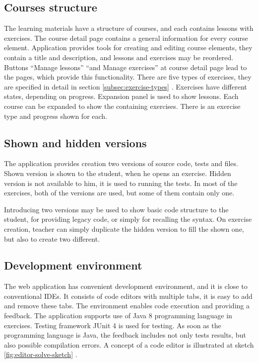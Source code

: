         \subsection{Courses structure}
        The learning materials have a structure of courses, and each contains lessons with exercises. The course detail page contains a general information for every course element. Application provides tools for creating and editing course elements, they contain a title and description, and lessons and exercises may be reordered. Buttons ``Manage lessons'' ``and Manage exercises'' at course detail page lead to the pages, which provide this functionality. There are five types of exercises, they are specified in detail in section \ref{subsec:exercise-types} . Exercises have different states, depending on progress. Expansion panel is used to show lessons. Each course can be expanded to show the containing exercises. There is an exercise type and progress shown for each.
        
        \subsection{Shown and hidden versions}
        The application provides creation two versions of source code, tests and files. Shown version is shown to the student, when he opens an exercise. Hidden version is not available to him, it is used to running the tests. In most of the exercises, both of the versions are used, but some of them contain only one.
        
        Introducing two versions may be used to show basic code structure to the student, for providing legacy code, or simply for recalling the syntax. On exercise creation, teacher can simply duplicate the hidden version to fill the shown one, but also to create two different.
        
        \subsection{Development environment}
        The web application has convenient development environment, and it is close to conventional IDEs. It consists of code editors with multiple tabs, it is easy to add and remove these tabs. The environment enables code execution and providing a feedback. The application supports use of Java 8 programming language in exercises. Testing framework JUnit 4 is used for testing. As soon as the programming language is Java, the feedback includes not only tests results, but also possible compilation errors. A concept of a code editor is illustrated at sketch \ref{fig:editor-solve-sketch} .
        
